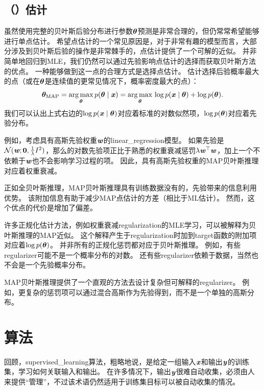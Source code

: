 \subsection{（）估计}
\label{sec:maximum_a_posteriori_map_estimation}
虽然使用完整的贝叶斯后验分布进行参数$\boldsymbol{\theta}$预测是非常合理的，但仍常常希望能够进行单点估计。
希望点估计的一个常见原因是，对于非常有趣的模型而言，大部分涉及到贝叶斯后验的操作是非常棘手的，点估计提供了一个可解的近似。
并非简单地回归到\gls{MLE}，我们仍然可以通过先验影响点估计的选择而获取贝叶斯方法的优点。
一种能够做到这一点的合理方式是选择点估计。
估计选择后验概率最大的点（或在$\boldsymbol{\theta}$是连续值的更常见情况下，概率密度最大的点）：
\begin{equation}
\label{eq:5.79}
    \boldsymbol{\theta}_{\text{MAP}} = \underset{\boldsymbol{\theta}}{\arg\max} \, p(\boldsymbol{\theta}\mid\boldsymbol{\mathit{x}})
    = \underset{\boldsymbol{\theta}}{\arg\max} \, \log p(\boldsymbol{\mathit{x}} \mid \boldsymbol{\theta}) + \log p(\boldsymbol{\theta}) .
\end{equation}
我们可以认出上式右边的$\log p(\boldsymbol{\mathit{x}} \mid \boldsymbol{\theta})$对应着标准的对数似然项，$\log p(\boldsymbol{\theta})$对应着先验分布。


例如，考虑具有高斯先验权重$\boldsymbol{\mathit{w}}$的\gls{linear_regression}模型。
如果先验是$\mathcal{N}(\boldsymbol{\mathit{w}};\mathbf{0},\frac{1}{\lambda}I^2)$，那么的对数先验项正比于熟悉的权重衰减惩罚$\lambda \boldsymbol{\mathit{w}}^\top\boldsymbol{\mathit{w}}$，加上一个不依赖于$\boldsymbol{\mathit{w}}$也不会影响学习过程的项。
因此，具有高斯先验权重的\gls{MAP}贝叶斯推理对应着权重衰减。

正如全贝叶斯推理，\gls{MAP}贝叶斯推理具有训练数据没有的，先验带来的信息利用优势。
该附加信息有助于减少\gls{MAP}点估计的方差（相比于ML估计）。
然而，这个优点的代价是增加了偏差。

许多正规化估计方法，例如权重衰减\gls{regularization}的\gls{MLE}学习，可以被解释为贝叶斯推理的\gls{MAP}近似。
这个解释产生于\gls{regularization}时加到\gls{target}函数的附加项对应着$\log p(\boldsymbol{\theta})$。
并非所有的正规化惩罚都对应于贝叶斯推理。
例如，有些\gls{regularizer}可能不是一个概率分布的对数。
还有些\gls{regularizer}依赖于数据，当然也不会是一个先验概率分布。

\gls{MAP}贝叶斯推理提供了一个直观的方法去设计复杂但可解释的\gls{regularizer}。
例如，更复杂的惩罚项可以通过混合高斯作为先验得到，而不是一个单独的高斯分布\citep{Nowlan-nips92}。

\section{算法}
\label{sec:supervised_learning_algorithms}
回顾，\gls{supervised_learning}算法，粗略地说，是给定一组输入$\boldsymbol{\mathit{x}}$和输出$\boldsymbol{\mathit{y}}$的训练集，学习如何关联输入和输出。
在许多情况下，输出$\boldsymbol{\mathit{y}}$很难自动收集，必须由人来提供“管理”，不过该术语仍然适用于训练集目标可以被自动收集的情况。

